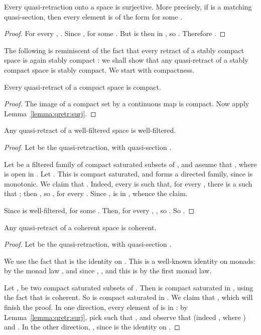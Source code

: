 \documentclass{LMCS}
\begin{document}
\begin{lem}
  \label{lemma:qretr:surj}
  Every quasi-retraction  onto a  space  is
  surjective.  More precisely, if  is a matching quasi-section,
  then every element  is of the form  for some .
\end{lem}
\begin{proof}
  For every , .  Since ,  for some .  But
   is then in , so .
  Therefore .
\end{proof}

The following is reminiscent of the fact that every retract of a
stably compact space is again stably compact \cite[Proposition, bottom
of p.153, and subsequent discussion]{Lawson:versatile}: we shall show
that any  quasi-retract of a stably compact space is stably
compact.  We start with compactness.
\begin{lem}
  \label{lemma:qretr:comp}
  Every  quasi-retract  of a compact space  is compact.
\end{lem}
\begin{proof}
  The image of a compact set by a continuous map is compact.  Now
  apply Lemma~\ref{lemma:qretr:surj}.
\end{proof}

\begin{lem}
  \label{lemma:qretr:wf}
  Any quasi-retract  of a well-filtered space  is well-filtered.
\end{lem}
\begin{proof}
  Let  be the quasi-retraction, with quasi-section .

  Let  be a filtered family of compact saturated
  subsets of , and assume that , where  is open in .  Let .  This is compact saturated, and forms a directed family,
  since  is monotonic.  We claim that .  Indeed, every  is such that, for every , there is a 
  such that ; then , so , for every .  Since
  ,  is in ,
  whence the claim.

  Since  is well-filtered,  for some .  Then, for every , , so .  So .
\end{proof}

\begin{lem}
  \label{lemma:qretr:coh}
  Any  quasi-retract  of a coherent space  is coherent.
\end{lem}
\begin{proof}
  Let  be the quasi-retraction, with quasi-section .

  We use the fact that  is the identity on
  .  This is a well-known identity on monads: by the monad
  law , and
  since , , and this is
   by the first monad law.

  Let ,  be two compact saturated subsets of .  Then
   is compact saturated in
  , using the fact that  is coherent.  So  is compact saturated in .  We
  claim that , which will finish the proof.  In one direction, every
  element  of  is in : by Lemma~\ref{lemma:qretr:surj}, pick  such that , and observe that  (indeed , where ) and
  .  In the other direction, , since  is the identity on .
\end{proof}
\end{document}
